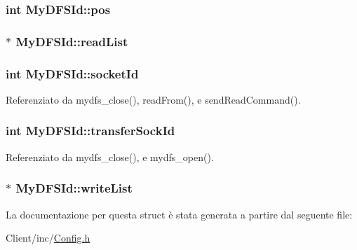 \hypertarget{structMyDFSId_aaeac229fb85c313f91a76f00be916832}{
\subsubsection[{pos}]{\setlength{\rightskip}{0pt plus 5cm}int My\+D\+F\+S\+Id\+::pos}}\label{structMyDFSId_aaeac229fb85c313f91a76f00be916832}
\hypertarget{structMyDFSId_a8a4360512d45c22b6d8e980967c7dd32}{
\subsubsection[{read\+List}]{$\ast$ My\+D\+F\+S\+Id\+::read\+List}}\label{structMyDFSId_a8a4360512d45c22b6d8e980967c7dd32}
\hypertarget{structMyDFSId_a382a74f109962751085cea7aac2892cc}{
\subsubsection[{socket\+Id}]{\setlength{\rightskip}{0pt plus 5cm}int My\+D\+F\+S\+Id\+::socket\+Id}}\label{structMyDFSId_a382a74f109962751085cea7aac2892cc}


Referenziato da mydfs\+\_\+close(), read\+From(), e send\+Read\+Command().

\hypertarget{structMyDFSId_a3b62a6d0f52a871bda4bf9cd56c57ff7}{
\subsubsection[{transfer\+Sock\+Id}]{\setlength{\rightskip}{0pt plus 5cm}int My\+D\+F\+S\+Id\+::transfer\+Sock\+Id}}\label{structMyDFSId_a3b62a6d0f52a871bda4bf9cd56c57ff7}


Referenziato da mydfs\+\_\+close(), e mydfs\+\_\+open().

\hypertarget{structMyDFSId_a0f7d2a9c60ddc649ee7e65b8b9295432}{
\subsubsection[{write\+List}]{$\ast$ My\+D\+F\+S\+Id\+::write\+List}}\label{structMyDFSId_a0f7d2a9c60ddc649ee7e65b8b9295432}


La documentazione per questa struct è stata generata a partire dal seguente file\+:\begin{DoxyCompactItemize}
\item 
Client/inc/\hyperlink{Client_2inc_2Config_8h}{Config.\+h}\end{DoxyCompactItemize}
